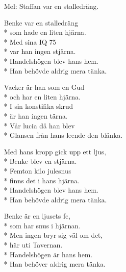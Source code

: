 \begin{SongText}
    \begin{SongVerse}
        Mel: Staffan var en stalledräng.
    \end{SongVerse}
    \begin{SongVerse}
        Benke var en stalledräng\\*%
        som hade en liten hjärna.\\*%
        Med sina IQ 75\\*%
        var han ingen stjärna.\\*%
        Handelshögen blev hans hem.\\*%
        Han behövde aldrig mera tänka.
    \end{SongVerse}
    \begin{SongVerse}
        Vacker är han som en Gud\\*%
        och har en liten hjärna.\\*%
        I sin konstifika skrud\\*%
        är han ingen tärna.\\*%
        Vår lucia då han blev\\*%
        Glansen från hans leende den blänka.
    \end{SongVerse}
    \begin{SongVerse}
        Med hans kropp gick upp ett ljus,\\*%
        Benke blev en stjärna.\\*%
        Femton kilo julesnus\\*%
        finns det i hans hjärna.\\*%
        Handelshögen blev hans hem.\\*%
        Han behövde aldrig mera tänka.
    \end{SongVerse}
    \begin{SongVerse}
        Benke är en ljusets fe,\\*%
        som har snus i hjärnan.\\*%
        Men ingen bryr sig väl om det,\\*%
        här uti Tavernan.\\*%
        Handelshögen är hans hem.\\*%
        Han behöver aldrig mera tänka.
    \end{SongVerse}
    \begin{SongVerse}
    \end{SongVerse}
\end{SongText}
\newpage